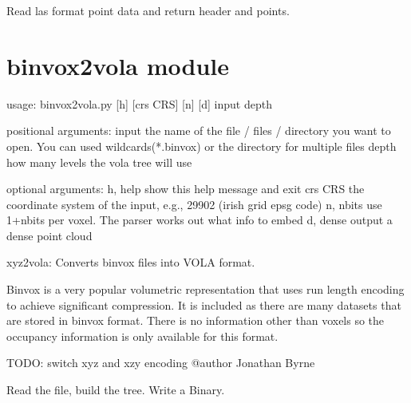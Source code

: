 \documentclass[letterpaper,10pt,english]{sphinxmanual}
\begin{document}

\begin{fulllineitems}
\label{\detokenize{stl2vola:stl2vola.parse_stl}}
Read las format point data and return header and points.

\end{fulllineitems}



\section{binvox2vola module}
\label{\detokenize{binvox2vola::doc}}\label{\detokenize{binvox2vola:binvox2vola-module}}
\begin{sphinxVerbatim}[commandchars=\\\{\}]
usage: binvox2vola.py [\PYGZhy{}h] [\PYGZhy{}\PYGZhy{}crs CRS] [\PYGZhy{}n] [\PYGZhy{}d] input depth

positional arguments:
  input        the name of the file / files / directory you want to open. You
               can used wildcards(*.binvox) or the directory for multiple
               files
  depth        how many levels the vola tree will use

optional arguments:
  \PYGZhy{}h, \PYGZhy{}\PYGZhy{}help   show this help message and exit
  \PYGZhy{}\PYGZhy{}crs CRS    the coordinate system of the input, e.g., 29902 (irish grid
               epsg code)
  \PYGZhy{}n, \PYGZhy{}\PYGZhy{}nbits  use 1+nbits per voxel. The parser works out what info to embed
  \PYGZhy{}d, \PYGZhy{}\PYGZhy{}dense  output a dense point cloud
\end{sphinxVerbatim}
\label{\detokenize{binvox2vola:module-binvox2vola}}
xyz2vola: Converts binvox files into VOLA format.

Binvox is a very popular volumetric representation that uses run
length encoding to achieve significant compression. It is included
as there are many datasets that are stored in binvox format.
There is no information other than voxels so the occupancy information
is only available for this format.

TODO: switch xyz and xzy encoding
@author Jonathan Byrne

\begin{fulllineitems}
\label{\detokenize{binvox2vola:binvox2vola.main}}
Read the file, build the tree. Write a Binary.

\end{fulllineitems}
\end{document}
